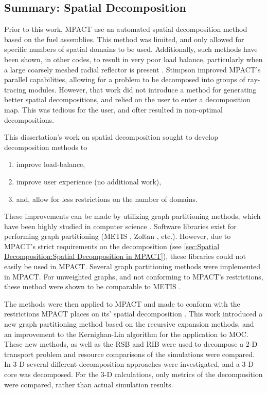 {{    \subsection{Summary: Spatial Decomposition}{\label{ssec:Summary:Spatial Decomposition}
      Prior to this work, MPACT \cite{MPACT2016} use an automated spatial decomposition method based on the fuel assemblies.
      This method was limited, and only allowed for specific numbers of spatial domains to be used.
      Additionally, such methods have been shown, in other codes, to result in very poor load balance, particularly when a large coarsely meshed radial reflector is present \cite{Gunow2018}.
      Stimpson \cite{StimpsonPartitioning2017} improved MPACT's parallel capabilities, allowing for a problem to be decomposed into groups of ray-tracing modules.
      However, that work did not introduce a method for generating better spatial decompositions, and relied on the user to enter a decomposition map.
      This was tedious for the user, and ofter resulted in non-optimal decompositions.

      This dissertation's work on spatial decomposition sought to develop decomposition methods to
      \begin{enumerate}
        \item{improve load-balance,}
        \item{improve user experience (no additional work),}
        \item{and, allow for less restrictions on the number of domains.}
      \end{enumerate}
      These improvements can be made by utilizing graph partitioning methods, which have been highly studied in computer science \cite{Elsner1997}.
      Software libraries exist for performing graph partitioning (METIS \cite{METIS}, Zoltan \cite{Boman2012}, etc.).
      However, due to MPACT's strict requirements on the decomposition (see \cref{sec:Spatial Decomposition:Spatial Decomposition in MPACT}), these libraries could not easily be used in MPACT.
      Several graph partitioning methods were implemented in MPACT.
      For unweighted graphs, and not conforming to MPACT's restrictions, these method were shown to be comparable to METIS \cite{Fitzgerald2017}.

      The methods were then applied to MPACT and made to conform with the restrictions MPACT places on its' spatial decomposition \cite{Fitzgerald2019a}.
      This work introduced a new graph partitioning method based on the recursive expansion methods, and an improvement to the Kernighan-Lin \cite{Kernighan1970} algorithm for the application to \ac{MOC}.
      These new methods, as well as the \acf{RSB} and \acf{RIB} were used to decompose a 2-D transport problem and resource comparisons of the simulations were compared.
      In 3-D several different decomposition approaches were investigated, and a 3-D core was decomposed.
      For the 3-D calculations, only metrics of the decomposition were compared, rather than actual simulation results.
    }

}}
